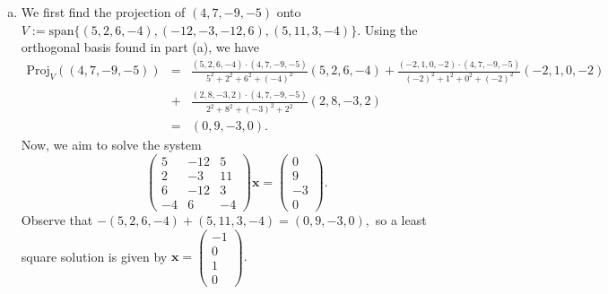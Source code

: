 \documentclass{article}
\newcommand{\spn}{\text{span}}
\begin{document}
\begin{enumerate}[(a)]
    \item We first find the projection of $(4,7,-9,-5)$ onto $V:=\spn\{(5,2,6,-4),(-12,-3,-12,6),(5,11,3,-4)\}.$ Using the orthogonal basis found in part (a), we have \begin{eqnarray*}
    \text{Proj}_V((4,7,-9,-5))&=&\frac{(5,2,6,-4)\cdot(4,7,-9,-5)}{5^2+2^2+6^2+(-4)^2}(5,2,6,-4)+\frac{(-2,1,0,-2)\cdot(4,7,-9,-5)}{(-2)^2+1^2+0^2+(-2)^2}(-2,1,0,-2)\\
    &+&\frac{(2,8,-3,2)\cdot(4,7,-9,-5)}{2^2+8^2+(-3)^2+2^2}(2,8,-3,2)\\
    &=&(0,9,-3,0).
    \end{eqnarray*}
    Now, we aim to solve the system $$\begin{pmatrix}5&-12&5\\2&-3&11\\6&-12&3\\-4&6&-4\end{pmatrix}\textbf{x}=\begin{pmatrix}0\\9\\-3\\0\end{pmatrix}.$$
    Observe that $-(5,2,6,-4)+(5,11,3,-4)=(0,9,-3,0),$ so a least square solution is given by $\textbf{x}=\begin{pmatrix}-1\\0\\1\\0\end{pmatrix}.$
\end{enumerate}
\end{document}
